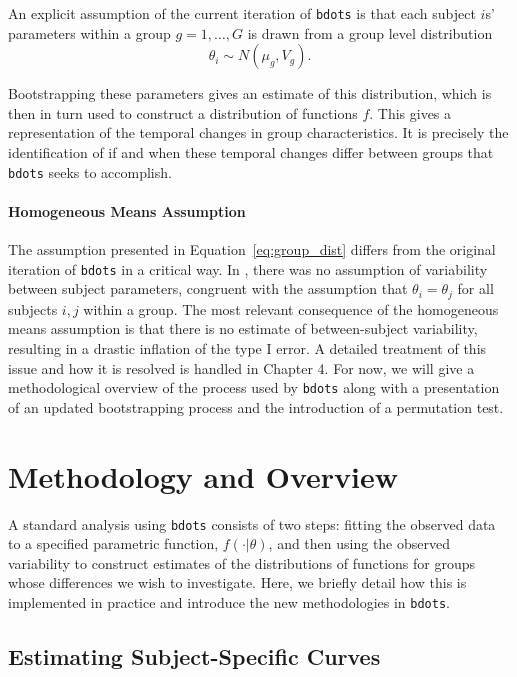 \documentclass{article}
\newcommand{\xt}{\texttt}%
\begin{document}
An explicit assumption of the current iteration of \xt{bdots} is that each subject $i$s' parameters within a group $g = 1, \dots, G$ is drawn from a group level distribution
\begin{equation}\label{eq:group_dist}
\theta_i \sim N(\mu_g, V_g).
\end{equation}

Bootstrapping these parameters gives an estimate of this distribution, which is then in turn used to construct a distribution of functions $f$. This gives a representation of the temporal changes in group characteristics. It is precisely the identification of if and when these temporal changes differ between groups that \xt{bdots} seeks to accomplish.


\paragraph{Homogeneous Means Assumption}

The assumption presented in Equation~\ref{eq:group_dist} differs from the original iteration of \xt{bdots} in a critical way. In \citet{oleson2017detecting}, there was no assumption of variability between subject parameters, congruent with the assumption that $\theta_i = \theta_j$ for all subjects $i, j$ within a group. The most relevant consequence of the homogeneous means assumption is that there is no estimate of between-subject variability, resulting in a drastic inflation of the type I error. A detailed treatment of this issue and how it is resolved is handled in Chapter 4. For now, we will give a methodological overview of the process used by \xt{bdots} along with a presentation of an updated bootstrapping process and the introduction of a permutation test.




\section{Methodology and Overview} 

A standard analysis using \xt{bdots} consists of two steps: fitting the observed data to a specified parametric function, $f(\cdot|\theta)$, and then using the observed variability to construct estimates of the distributions of functions for groups whose differences we wish to investigate.  Here, we briefly detail how this is implemented in practice and introduce the new methodologies in \xt{bdots}. 



\subsection{Estimating Subject-Specific Curves}
\end{document}
